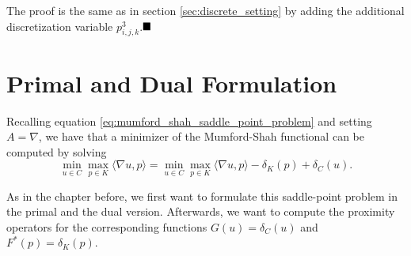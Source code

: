 \documentclass{scrreprt}
\newcommand{\qed}{$\hfill\blacksquare$}
\newenvironment{proof}[1][Proof]{\begin{trivlist}
\item[\hskip \labelsep {\bfseries #1}]}{\end{trivlist}}
\begin{document}
        \begin{proof}
        	The proof is the same as in section \ref{sec:discrete_setting} by adding the additional discretization variable $p^{3}_{i,j,k}$.\qed
        \end{proof}


    \section{Primal and Dual Formulation} %
    \label{sub:primal_and_dual_formulation}

    	Recalling equation \ref{eq:mumford_shah_saddle_point_problem} and setting $A = \nabla$, we have that a minimizer of the Mumford-Shah functional can be computed by solving
    		\begin{equation}
    			\min_{u \in C} \max_{p \in K} \langle \nabla u, p \rangle = \min_{u \in C} \max_{p \in K} \langle \nabla u, p \rangle - \delta_{K}(p) + \delta_{C}(u).
    			\label{eq:primal_dual_mumford_shah}
    		\end{equation}

    	As in the chapter before, we first want to formulate this saddle-point problem in the primal and the dual version. Afterwards, we want to compute the proximity operators for the corresponding functions $G(u) = \delta_{C}(u)$ and $F^{\ast}(p) = \delta_{K}(p)$.
\end{document}
